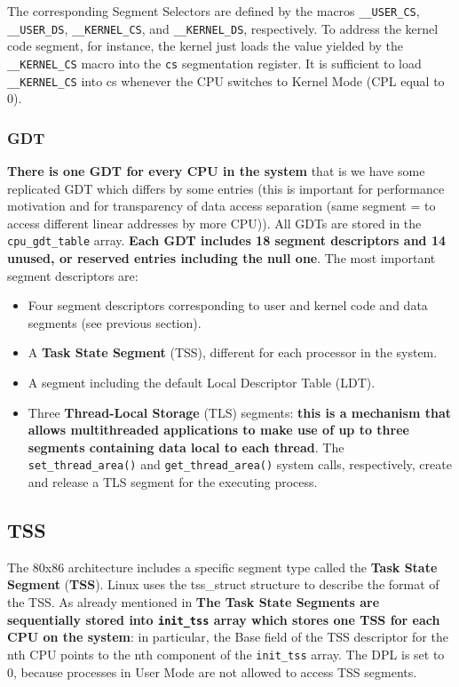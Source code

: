 \documentclass[10pt,a4paper]{article}
\begin{document}
The corresponding Segment Selectors are defined by the macros \texttt{\_\_USER\_CS}, \texttt{\_\_USER\_DS}, \texttt{\_\_KERNEL\_CS}, and \texttt{\_\_KERNEL\_DS}, respectively. To address the kernel code segment, for instance, the kernel just loads the value yielded by the \texttt{\_\_KERNEL\_CS} macro into the \texttt{cs} segmentation register. It is sufficient to load \texttt{\_\_KERNEL\_CS} into cs whenever the CPU switches to Kernel Mode (CPL equal to 0).

\subsubsection{GDT}

\textbf{There is one GDT for every CPU in the system} that is we have some replicated GDT which differs by some entries (this is important for performance motivation and for transparency of data access separation (same segment = to access different linear addresses by more CPU)). All GDTs are stored in the \texttt{cpu\_gdt\_table} array.  \textbf{Each GDT includes 18 segment descriptors and 14 unused, or reserved entries including the null one}. The most important segment descriptors are:
\begin{itemize}
\item Four segment descriptors corresponding to user and kernel code and data segments (see previous section).
\item A \textbf{Task State Segment} (TSS), different for each processor in the system.
\item A segment including the default Local Descriptor Table (LDT).
\item Three \textbf{Thread-Local Storage} (TLS) segments: \textbf{this is a mechanism that allows multithreaded applications to make use of up to three segments containing data local to each thread}. The \texttt{set\_thread\_area()} and \texttt{get\_thread\_area()} system calls, respectively, create and release a TLS segment for the executing process.
\end{itemize}

\subsection{TSS}

The 80x86 architecture includes a specific segment type called the \textbf{Task State Segment} (\textbf{TSS}). Linux uses the tss\_struct structure to describe the format of the TSS. As already mentioned in
\textbf{The Task State Segments are sequentially stored into \texttt{init\_tss} array which stores one TSS for each CPU on the system}: in particular, the Base field of the TSS descriptor for the nth CPU points to the nth component of the \texttt{init\_tss} array. The DPL is set to 0, because processes in User Mode are not allowed to
access TSS segments.
\end{document}

